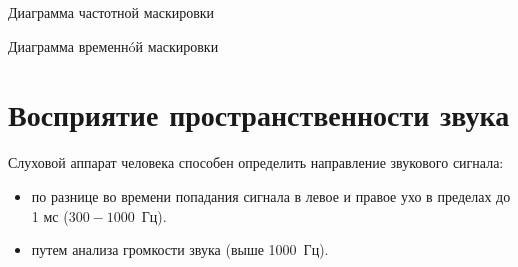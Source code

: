 \documentclass{beamer}
\begin{document}
\begin{frame}
  \begin{block}{Диаграмма частотной маскировки}
  \end{block}
  \begin{block}{Диаграмма временн{\'o}й маскировки}
  \end{block}  
\end{frame}
 
\section{Восприятие пространственности звука} 
\begin{frame}
  Слуховой аппарат человека способен определить направление звукового сигнала:
  \begin{itemize}
    \item по разнице во времени попадания сигнала в левое и правое ухо в пределах до 1 мс ($300-1000$~Гц). 
    \item путем анализа громкости звука (выше 1000~Гц).
  \end{itemize} 
\end{frame} 
 
\end{document}

